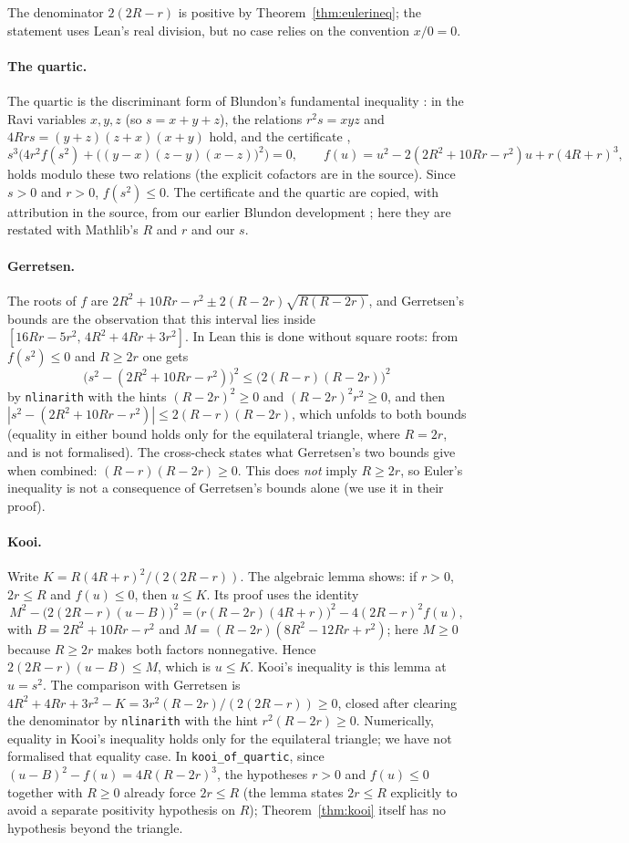 \documentclass[11pt]{article}
\theoremstyle{definition}
\theoremstyle{remark}
\newcommand{\lean}[1]{\texttt{#1}}
\begin{document}
The denominator $2(2R-r)$ is positive by Theorem~\ref{thm:eulerineq}; the statement uses Lean's
real division, but no case relies on the convention $x/0=0$.

\paragraph{The quartic.} The quartic is the discriminant form of Blundon's fundamental inequality
\cite{blundon1965}: in the Ravi variables $x,y,z$ (so $s=x+y+z$), the relations
$r^2s=xyz$ and $4Rrs=(y+z)(z+x)(x+y)$ hold, and the certificate
,
\[
s^3\bigl(4r^2 f(s^2)+\bigl((y-x)(z-y)(x-z)\bigr)^2\bigr)=0,\qquad
f(u)=u^2-2(2R^2+10Rr-r^2)u+r(4R+r)^3,
\]
holds modulo these two relations (the explicit cofactors are in the source). Since $s>0$ and
$r>0$, $f(s^2)\le0$. The certificate and the quartic are copied, with attribution in the source,
from our earlier Blundon development \cite{paperD}; here they are restated with Mathlib's $R$ and
$r$ and our $s$.

\paragraph{Gerretsen.} The roots of $f$ are $2R^2+10Rr-r^2\pm2(R-2r)\sqrt{R(R-2r)}$, and
Gerretsen's bounds are the observation that this interval lies inside
$[16Rr-5r^2,\,4R^2+4Rr+3r^2]$. In Lean this is done without square roots: from $f(s^2)\le 0$ and
$R\ge 2r$ one gets
\[
\bigl(s^2-(2R^2+10Rr-r^2)\bigr)^2\le\bigl(2(R-r)(R-2r)\bigr)^2
\]
by \lean{nlinarith} with the hints $(R-2r)^2\ge0$ and $(R-2r)^2r^2\ge0$, and then
$|s^2-(2R^2+10Rr-r^2)|\le 2(R-r)(R-2r)$, which unfolds to both bounds (equality in either bound holds only for the equilateral triangle, where $R=2r$, and is not formalised). The cross-check states what
Gerretsen's two bounds give when combined: $(R-r)(R-2r)\ge0$. This does \emph{not} imply $R\ge2r$,
so Euler's inequality is not a consequence of Gerretsen's bounds alone (we use it in their proof).

\paragraph{Kooi.} Write $K=R(4R+r)^2/(2(2R-r))$. The algebraic lemma
 shows: if $r>0$, $2r\le R$ and $f(u)\le0$, then $u\le K$. Its proof
uses the identity
\[
M^2-\bigl(2(2R-r)(u-B)\bigr)^2=\bigl(r(R-2r)(4R+r)\bigr)^2-4(2R-r)^2f(u),
\]
with $B=2R^2+10Rr-r^2$ and $M=(R-2r)(8R^2-12Rr+r^2)$; here $M\ge0$ because $R\ge2r$ makes both
factors nonnegative. Hence $2(2R-r)(u-B)\le M$, which is $u\le K$. Kooi's inequality is this lemma at
$u=s^2$. The comparison with Gerretsen is
$4R^2+4Rr+3r^2-K=3r^2(R-2r)/(2(2R-r))\ge0$, closed after clearing the denominator by
\lean{nlinarith} with the hint $r^2(R-2r)\ge0$. Numerically, equality in Kooi's inequality holds only for
the equilateral triangle; we have not formalised that equality case. In \lean{kooi\_of\_quartic}, since $(u-B)^2-f(u)=4R(R-2r)^3$, the hypotheses $r>0$ and $f(u)\le0$
together with $R\ge0$ already force $2r\le R$ (the lemma states $2r\le R$ explicitly to avoid a separate
positivity hypothesis on $R$); Theorem~\ref{thm:kooi} itself has no hypothesis beyond the triangle.
\end{document}
